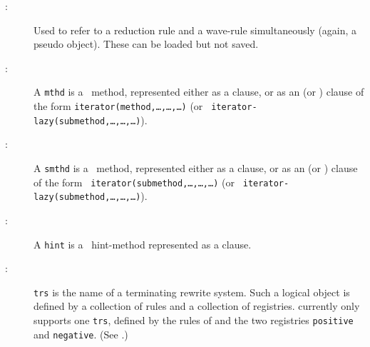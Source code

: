 \begin{description}
\item [{\tt {}}:]
Used to refer to a reduction rule and a wave-rule simultaneously
(again, a pseudo object).  These can be loaded but not saved.

\item[{\tt {}}:]
A {\tt mthd} is a \clam\ method,
represented either as a  clause, or as an 
(or )
clause of the form {\tt iterator(method,\ldots,\ldots,\ldots)} (or {\tt
iterator-lazy(submethod,\ldots,\ldots,\ldots)}).

\item[{\tt {}}:]
A {\tt smthd} is a \clam\ method,
represented either as a  clause, or as an
 (or ) clause of the form {\tt
iterator(submethod,\ldots,\ldots,\ldots)} (or {\tt
iterator-lazy(submethod,\ldots,\ldots,\ldots)}).

\item[{\tt {}}:]
A {\tt hint} is a \clam\ hint-method
represented as a  clause.

\item[{\tt {}}:]
{\tt trs} is the name of a terminating
rewrite system.  Such a logical object is defined by a collection of
rules and a collection of registries.  \clam currently only supports
one {\tt trs}, defined by the rules of  and the
two registries {\tt positive} and {\tt negative}. (See
.)
\end{description}

